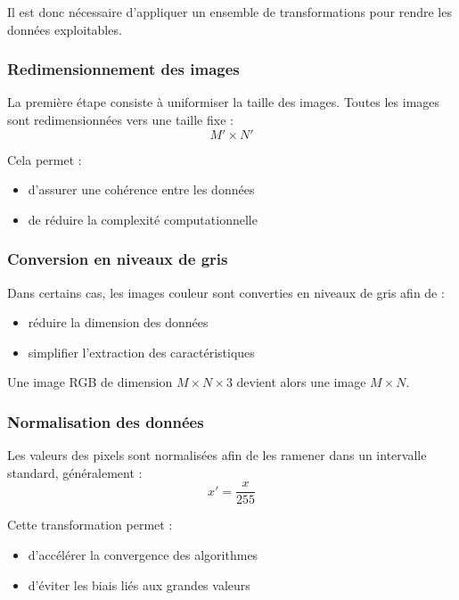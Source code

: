 \documentclass[12pt,a4paper]{article}
\begin{document}
    Il est donc nécessaire d’appliquer un ensemble de transformations pour rendre les données exploitables.

    \subsubsection{Redimensionnement des images}

    La première étape consiste à uniformiser la taille des images.
    Toutes les images sont redimensionnées vers une taille fixe :
    \[
    M' \times N'
    \]

    Cela permet :
    \begin{itemize}
        \item d’assurer une cohérence entre les données
        \item de réduire la complexité computationnelle
    \end{itemize}

    \subsubsection{Conversion en niveaux de gris}

    Dans certains cas, les images couleur sont converties en niveaux de gris afin de :
    \begin{itemize}
        \item réduire la dimension des données
        \item simplifier l’extraction des caractéristiques
    \end{itemize}

    Une image RGB de dimension \(M \times N \times 3\) devient alors une image \(M \times N\).

    \subsubsection{Normalisation des données}

    Les valeurs des pixels sont normalisées afin de les ramener dans un intervalle standard, généralement :
    \[
    x' = \frac{x}{255}
    \]

    Cette transformation permet :
    \begin{itemize}
        \item d’accélérer la convergence des algorithmes
        \item d’éviter les biais liés aux grandes valeurs
    \end{itemize}
\end{document}
